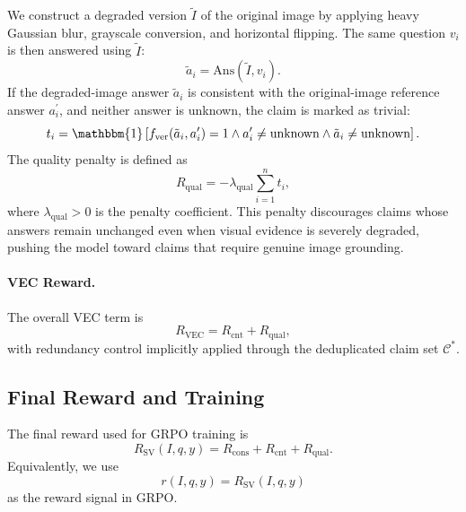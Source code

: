 We construct a degraded version $\tilde{I}$ of the original image by applying
heavy Gaussian blur, grayscale conversion, and horizontal flipping. The same
question $v_i$ is then answered using $\tilde{I}$:
\begin{equation}
    \tilde{a}_i
    =
    \mathrm{Ans}(\tilde{I},v_i).
\end{equation}
If the degraded-image answer $\tilde{a}_i$ is consistent with the original-image
reference answer $a_i^{\prime}$, and neither answer is unknown, the claim is
marked as trivial:
\begin{equation}
    t_i
    =
    \mathbbm{1}
    \left[
    f_{\mathrm{ver}}(\tilde{a}_i,a_i^{\prime})=1
    \land
    a_i^{\prime}\neq \mathrm{unknown}
    \land
    \tilde{a}_i\neq \mathrm{unknown}
    \right].
\end{equation}
The quality penalty is defined as
\begin{equation}
    R_{\mathrm{qual}}
    =
    -
    \lambda_{\mathrm{qual}}
    \sum_{i=1}^{n} t_i,
\end{equation}
where $\lambda_{\mathrm{qual}}>0$ is the penalty coefficient. This penalty
discourages claims whose answers remain unchanged even when visual evidence is
severely degraded, pushing the model toward claims that require genuine image
grounding.

\paragraph{VEC Reward.}
The overall VEC term is
\begin{equation}
    R_{\mathrm{VEC}}
    =
    R_{\mathrm{cnt}}
    +
    R_{\mathrm{qual}},
\end{equation}
with redundancy control implicitly applied through the deduplicated claim set
$\mathcal{C}^{\ast}$.

\subsection{Final Reward and Training}
\label{sec:final_reward}

The final reward used for GRPO training is
\begin{equation}
    R_{\mathrm{SV}}(I,q,y)
    =
    R_{\mathrm{cons}}
    +
    R_{\mathrm{cnt}}
    +
    R_{\mathrm{qual}}.
\end{equation}
Equivalently, we use
\begin{equation}
    r(I,q,y)=R_{\mathrm{SV}}(I,q,y)
\end{equation}
as the reward signal in GRPO.

